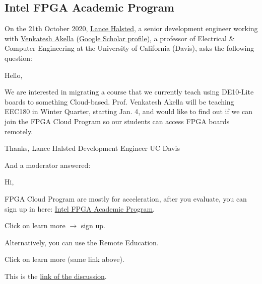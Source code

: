 \documentclass[a4paper]{article}
\begin{document}
    \subsection{Intel FPGA Academic Program}

    On the 21th October 2020, \href{https://ece.ucdavis.edu/directory/lance-halstead}{Lance Halsted}, a senior development engineer working with \href{https://ece.ucdavis.edu/directory/venkatesh-akella}{Venkatesh Akella} (\href{https://scholar.google.com/citations?hl=it&user=onJXki0AAAAJ}{Google Scholar profile}), a professor of Electrical \& Computer Engineering at the University of California (Davis), asks the following question:
    \begin{displayquote}
        Hello,\vspace{.5em}

        We are interested in migrating a course that we currently teach using DE10-Lite boards to something Cloud-based. Prof. Venkatesh Akella will be teaching EEC180 in Winter Quarter, starting Jan. 4, and would like to find out if we can join the FPGA Cloud Program so our students can access FPGA boards remotely.\vspace{.5em}

        Thanks,\newline
        Lance Halsted\newline
        Development Engineer\newline
        UC Davis
    \end{displayquote}
    And a moderator answered:
    \begin{displayquote}
        Hi,\vspace{.5em}

        FPGA Cloud Program are mostly for acceleration, after you evaluate, you can sign up in here:
        \href{https://software.intel.com/content/www/us/en/develop/topics/fpga-academic.html?}{Intel FPGA Academic Program}.

        Click on learn more $\rightarrow$ sign up.

        Alternatively, you can use the Remote Education.

        Click on learn more (same link above).
    \end{displayquote}
    This is the \href{https://community.intel.com/t5/Intel-FPGA-University-Program/FPGA-Cloud-Program-Remote-Education/m-p/1219913}{link of the discussion}.\newline
\end{document}
